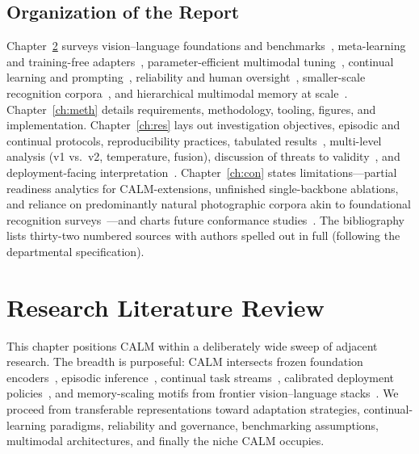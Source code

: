 \documentclass[12pt,a4paper]{report}
\begin{document}
\section{Organization of the Report}
Chapter~\ref{ch:lit} surveys vision--language foundations and benchmarks~\cite{r1,r2,r27}, meta-learning and training-free adapters~\cite{r3,r4}, parameter-efficient multimodal tuning~\cite{r11,r12,r13,r14,r15,r16}, continual learning and prompting~\cite{r6,r7,r8,r9,r17,r18,r19,r20}, reliability and human oversight~\cite{r5,r10,r21,r22,r23,r24,r25,r26}, smaller-scale recognition corpora~\cite{r28,r29,r30}, and hierarchical multimodal memory at scale~\cite{r31,r32}. Chapter~\ref{ch:meth} details requirements, methodology, tooling, figures, and implementation. Chapter~\ref{ch:res} lays out investigation objectives, episodic and continual protocols, reproducibility practices, tabulated results~\cite{r2,r3,r4}, multi-level analysis (v1 vs.\ v2, temperature, fusion), discussion of threats to validity~\cite{r19}, and deployment-facing interpretation~\cite{r23,r24,r25}. Chapter~\ref{ch:con} states limitations---partial readiness analytics for CALM-extensions, unfinished single-backbone ablations, and reliance on predominantly natural photographic corpora akin to foundational recognition surveys~\cite{r29,r30}---and charts future conformance studies~\cite{r10,r22}. The bibliography lists thirty-two numbered sources with authors spelled out in full (following the departmental specification).

\chapter{Research Literature Review}
\label{ch:lit}

This chapter positions CALM within a deliberately wide sweep of adjacent research. The breadth is purposeful: CALM intersects frozen foundation encoders~\cite{r1}, episodic inference~\cite{r3}, continual task streams~\cite{r7,r8}, calibrated deployment policies~\cite{r5,r10}, and memory-scaling motifs from frontier vision--language stacks~\cite{r31,r32}. We proceed from transferable representations toward adaptation strategies, continual-learning paradigms, reliability and governance, benchmarking assumptions, multimodal architectures, and finally the niche CALM occupies.
\end{document}
